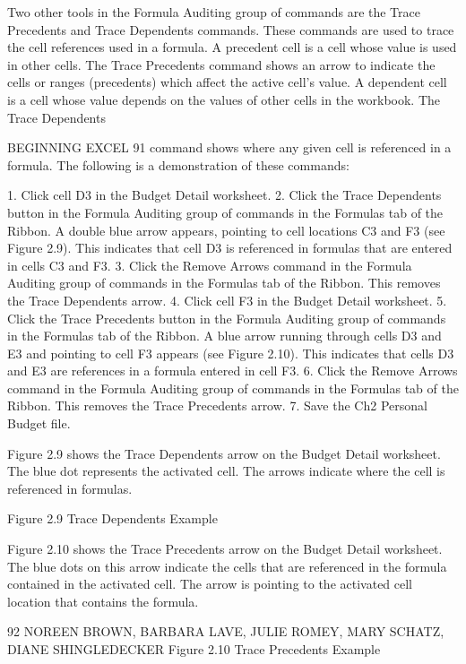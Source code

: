 Two other tools in the Formula Auditing group of commands are the Trace Precedents and Trace
Dependents commands. These commands are used to trace the cell references used in a formula. A
precedent cell is a cell whose value is used in other cells. The Trace Precedents command shows an
arrow to indicate the cells or ranges (precedents) which affect the active cell’s value. A dependent cell
is a cell whose value depends on the values of other cells in the workbook. The Trace Dependents

BEGINNING EXCEL 91
command shows where any given cell is referenced in a formula. The following is a demonstration of
these commands:

1. Click cell D3 in the Budget Detail worksheet.
2. Click the Trace Dependents button in the Formula Auditing group of commands in the
Formulas tab of the Ribbon. A double blue arrow appears, pointing to cell locations C3 and F3
(see Figure 2.9). This indicates that cell D3 is referenced in formulas that are entered in cells C3
and F3.
3. Click the Remove Arrows command in the Formula Auditing group of commands in the
Formulas tab of the Ribbon. This removes the Trace Dependents arrow.
4. Click cell F3 in the Budget Detail worksheet.
5. Click the Trace Precedents button in the Formula Auditing group of commands in the Formulas
tab of the Ribbon. A blue arrow running through cells D3 and E3 and pointing to cell F3 appears
(see Figure 2.10). This indicates that cells D3 and E3 are references in a formula entered in cell
F3.
6. Click the Remove Arrows command in the Formula Auditing group of commands in the
Formulas tab of the Ribbon. This removes the Trace Precedents arrow.
7. Save the Ch2 Personal Budget file.

Figure 2.9 shows the Trace Dependents arrow on the Budget Detail worksheet. The blue dot
represents the activated cell. The arrows indicate where the cell is referenced in formulas.




Figure 2.9 Trace Dependents Example


Figure 2.10 shows the Trace Precedents arrow on the Budget Detail worksheet. The blue dots on this
arrow indicate the cells that are referenced in the formula contained in the activated cell. The arrow
is pointing to the activated cell location that contains the formula.




92 NOREEN BROWN, BARBARA LAVE, JULIE ROMEY, MARY SCHATZ, DIANE SHINGLEDECKER
Figure 2.10 Trace Precedents Example




